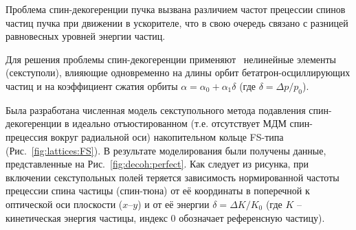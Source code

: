 Проблема спин-декогеренции пучка вызвана различием частот прецессии спинов частиц пучка 
при движении в ускорителе, что в свою очередь связано с разницей равновесных уровней энергии частиц. 

Для решения проблемы спин-декогеренции применяют~\cite{COSY:SCT:IPAC15, COSY:SCT:1000sec} 
нелинейные элементы (секступоли), влияющие одновременно на длины орбит бетатрон-осциллирующих частиц  
и на коэффициент сжатия орбиты ${\alpha = \alpha_0 + \alpha_1\delta}$ (где ${\delta=\Delta p/p_0}$).

Была разработана численная модель секступольного метода подавления спин-декогеренции 
в идеально отъюстированном (т.е. отсутствует МДМ спин-прецессия вокруг радиальной оси) накопительном кольце 
FS-типа (Рис.~\ref{fig:lattices:FS}). В результате моделирования были получены данные, представленные на Рис.~\ref{fig:decoh:perfect}. Как следует из рисунка, при включении секступольных полей теряется зависимость
нормированной частоты прецессии спина частицы (спин-тюна) от её координаты в поперечной к оптической оси
 плоскости ($x$--$y$) и от её энергии $\delta = \Delta K/K_0$ 
 (где $K$ -- кинетическая энергия частицы, индекс 0 обозначает референсную частицу).

